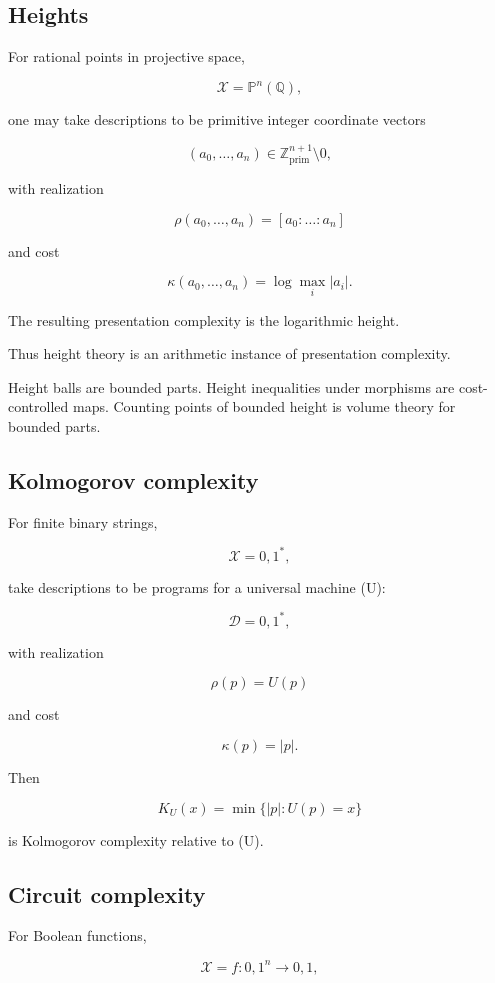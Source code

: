 \documentclass[11pt]{article}
\begin{document}
\subsection{Heights}

For rational points in projective space,

\[
\mathcal X=\mathbb P^n(\mathbb Q),
\]

one may take descriptions to be primitive integer coordinate vectors

\[
(a_0,\dots,a_n)\in \mathbb Z^{n+1}_{\mathrm{prim}}\setminus{0},
\]

with realization

\[
\rho(a_0,\dots,a_n)=[a_0:\dots:a_n]
\]

and cost

\[
\kappa(a_0,\dots,a_n)=\log\max_i|a_i|.
\]

The resulting presentation complexity is the logarithmic height.

Thus height theory is an arithmetic instance of presentation complexity.

Height balls are bounded parts. Height inequalities under morphisms are cost-controlled maps. Counting points of bounded height is volume theory for bounded parts.


\subsection{Kolmogorov complexity}

For finite binary strings,

\[
\mathcal X={0,1}^*,
\]

take descriptions to be programs for a universal machine (U):

\[
\mathcal D={0,1}^*,
\]

with realization

\[
\rho(p)=U(p)
\]

and cost

\[
\kappa(p)=|p|.
\]

Then

\[
K_U(x)=\min\{|p|:U(p)=x\}
\]

is Kolmogorov complexity relative to (U).


\subsection{Circuit complexity}

For Boolean functions,

\[
\mathcal X={f:{0,1}^n\to{0,1}},
\]
\end{document}
